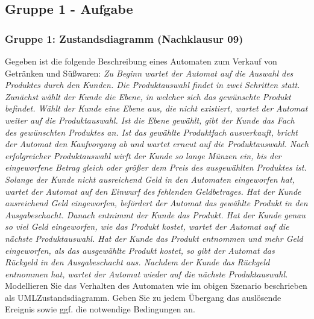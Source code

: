 \documentclass[18pt]{beamer}
\begin{document}
	\subsection{Gruppe 1 - Aufgabe}
	\begin{frame}
		\frametitle{Gruppe 1: Zustandsdiagramm (Nachklausur 09)}
		\begin{tiny}
			Gegeben ist die folgende Beschreibung eines Automaten zum Verkauf von Getränken und
			Süßwaren: \linebreak
			\textit{Zu Beginn wartet der Automat auf die Auswahl des Produktes durch den Kunden. Die
			Produktauswahl findet in zwei Schritten statt. Zunächst wählt der Kunde die Ebene, in
			welcher sich das gewünschte Produkt befindet. Wählt der Kunde eine Ebene aus, die
			nicht existiert, wartet der Automat weiter auf die Produktauswahl. Ist die Ebene gewählt,
			gibt der Kunde das Fach des gewünschten Produktes an. Ist das gewählte Produktfach
			ausverkauft, bricht der Automat den Kaufvorgang ab und wartet erneut auf
			die Produktauswahl. Nach erfolgreicher Produktauswahl wirft der Kunde so lange
			Münzen ein, bis der eingeworfene Betrag gleich oder größer dem Preis des ausgewählten
			Produktes ist. Solange der Kunde nicht ausreichend Geld in den Automaten eingeworfen
			hat, wartet der Automat auf den Einwurf des fehlenden Geldbetrages. Hat der
			Kunde ausreichend Geld eingeworfen, befördert der Automat das gewählte Produkt in
			den Ausgabeschacht. Danach entnimmt der Kunde das Produkt. Hat der Kunde genau
			so viel Geld eingeworfen, wie das Produkt kostet, wartet der Automat auf die nächste
			Produktauswahl. Hat der Kunde das Produkt entnommen und mehr Geld eingeworfen,
			als das ausgewählte Produkt kostet, so gibt der Automat das Rückgeld in den Ausgabeschacht
			aus. Nachdem der Kunde das Rückgeld entnommen hat, wartet der Automat
			wieder auf die nächste Produktauswahl.} \linebreak
			Modellieren Sie das Verhalten des Automaten wie im obigen Szenario beschrieben als UMLZustandsdiagramm.
			Geben Sie zu jedem Übergang das auslösende Ereignis sowie ggf. die
			notwendige Bedingungen an.
		\end{tiny}
	\end{frame}
	
\end{document}
